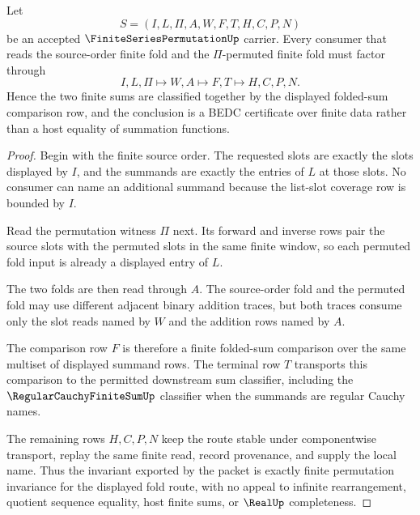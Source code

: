 \begin{theorem}
\label{thm:finite-series-permutation-sum-invariance}
Let
$$
S=(I,L,\Pi,A,W,F,T,H,C,P,N)
$$
be an accepted $\FiniteSeriesPermutationUp$ carrier. Every consumer that reads the source-order finite fold and the $\Pi$-permuted finite fold must factor through
$$
I,L,\Pi \longmapsto W,A \longmapsto F,T \longmapsto H,C,P,N .
$$
Hence the two finite sums are classified together by the displayed folded-sum comparison row, and the conclusion is a BEDC certificate over finite data rather than a host equality of summation functions.
\end{theorem}
\begin{proof}
Begin with the finite source order. The requested slots are exactly the slots displayed by $I$, and the summands are exactly the entries of $L$ at those slots. No consumer can name an additional summand because the list-slot coverage row is bounded by $I$.

Read the permutation witness $\Pi$ next. Its forward and inverse rows pair the source slots with the permuted slots in the same finite window, so each permuted fold input is already a displayed entry of $L$.

The two folds are then read through $A$. The source-order fold and the permuted fold may use different adjacent binary addition traces, but both traces consume only the slot reads named by $W$ and the addition rows named by $A$.

The comparison row $F$ is therefore a finite folded-sum comparison over the same multiset of displayed summand rows. The terminal row $T$ transports this comparison to the permitted downstream sum classifier, including the $\RegularCauchyFiniteSumUp$ classifier when the summands are regular Cauchy names.

The remaining rows $H,C,P,N$ keep the route stable under componentwise transport, replay the same finite read, record provenance, and supply the local name. Thus the invariant exported by the packet is exactly finite permutation invariance for the displayed fold route, with no appeal to infinite rearrangement, quotient sequence equality, host finite sums, or $\RealUp$ completeness.
\end{proof}


